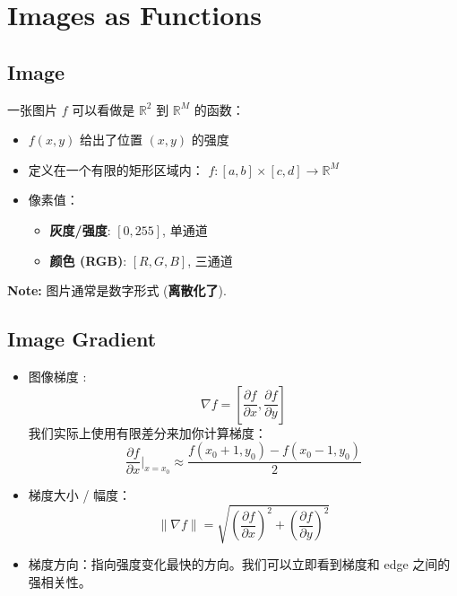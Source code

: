 \chapter{Images as Functions}

\section{Image}

一张图片 $ f $ 可以看做是 $ \mathbb{R}^2 $ 到 $ \mathbb{R}^M $ 的函数：
\begin{itemize}
    \item $ f(x,y) $ 给出了位置 $ (x,y) $ 的强度
    \item 定义在一个有限的矩形区域内：
    $ f: [a,b] \times [c,d] \rightarrow \mathbb{R}^M $
    \item 像素值：
    \begin{itemize}
        \item \textbf{灰度/强度}: $[0,255]$, 单通道
        \item \textbf{颜色 (RGB)}: $[R, G, B]$, 三通道
    \end{itemize}
\end{itemize}

\textbf{Note:} 图片通常是数字形式 (\textbf{离散化了}).

\section{Image Gradient}
\begin{itemize}
    \item 图像梯度 :
    $$
    \nabla f = \left[\frac{\partial f}{\partial x}, \frac{\partial f}{\partial y}\right]
    $$
    我们实际上使用有限差分来加你计算梯度：
    $$
    \frac{\partial f}{\partial x} \bigg|_{x=x_0} \approx \frac{f(x_0 + 1, y_0) - f(x_0 - 1, y_0)}{2}
    $$
    \item 梯度大小 / 幅度：
    $$
    \|\nabla f\| = \sqrt{\left(\frac{\partial f}{\partial x}\right)^2 + \left(\frac{\partial f}{\partial y}\right)^2}
    $$
    \item 梯度方向：指向强度变化最快的方向。我们可以立即看到梯度和 edge 之间的强相关性。
\end{itemize}

